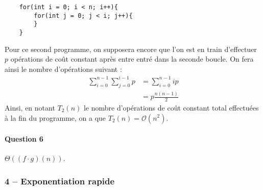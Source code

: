 \documentclass[10pt]{article}
\def\O{\mathcal{O}}
\begin{document}
    \begin{lstlisting}
    for(int i = 0; i < n; i++){
        for(int j = 0; j < i; j++){
        }
    }
    \end{lstlisting}
    Pour ce second programme, on supposera encore que l'on est en train d'effectuer $p$ opérations de coût constant après entre entré dans la seconde boucle. On fera ainsi le nombre d'opérations suivant :
    \begin{align*}
        \sum_{i=0}^{n-1}\sum_{j=0}^{i-1}p &= \sum_{i=0}^{n-1}ip\\
                                      &= p\frac{n(n-1)}2
    \end{align*}
    Ainsi, en notant $T_2(n)$ le nombre d'opérations de coût constant total effectuées à la fin du programme, on a que $T_2(n)=\O(n^2)$.

    \paragraph{Question 6} $\Theta((f\cdot g)(n))$.

    \subsubsection*{4 – Exponentiation rapide}
    
\end{document}
